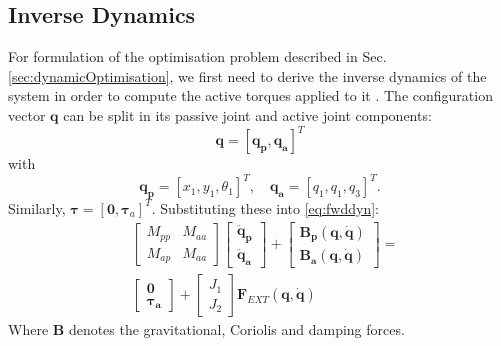 \documentclass[letterpaper, 10 pt, conference]{ieeeconf}  %
\begin{document}
\subsection{Inverse Dynamics}
For formulation of the optimisation problem described in Sec. \ref{sec:dynamicOptimisation}, we first need to derive the inverse dynamics of the system in order to compute the active torques applied to it \cite{nakanishi2007inverse}. The configuration vector $\mathbf{q}$ can be split in its passive joint and active joint components:
 \begin{equation}
\mathbf{q} = \left[\mathbf{q_p}, \mathbf{q_a}\right]^T
\end{equation}
with
 \begin{equation}
\mathbf{q_p} = [x_1,y_1,\theta_1]^T, \quad  
\mathbf{q_a} = [q_1,q_1,q_3]^T.
\end{equation}
\noindent
Similarly, $\boldsymbol{\tau} = \left[\mathbf{0},\boldsymbol{\tau}_a\right]^T$.
Substituting these into \eqref{eq:fwddyn}:
\begin{equation}
\begin{aligned}
&\left[\begin{array}{cc}  
M_{pp} & M_{aa}\\
M_{ap} & M_{aa}
\end{array} \right]
\left[\begin{array}{c}  
\mathbf{\ddot q_p}\\
\mathbf{\ddot q_a}
\end{array} \right] +
\left[\begin{array}{c}  
\mathbf{B_p (q,\dot q)}\\
\mathbf{B_a (q,\dot q)}
\end{array} \right] 
=\\
&\left[\begin{array}{c}  
\mathbf{0}\\
\boldsymbol{\tau_a}
\end{array} \right] 
+
\left[\begin{array}{c}  
J_1\\
J_2
\end{array} \right] 
\mathbf{F}_{EXT}\mathbf{(q, \dot q)}
\end{aligned} \label{eq:ik}
\end{equation}		
Where $\mathbf{B}$ denotes the gravitational, Coriolis and damping forces. 
\end{document}
